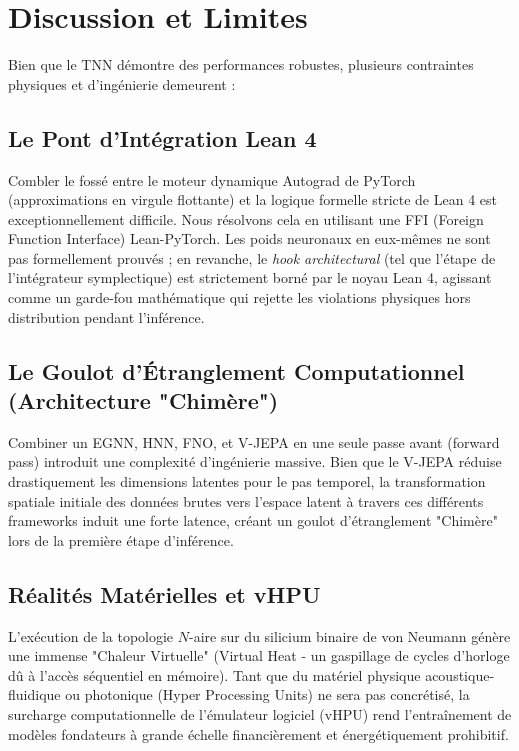 \documentclass[11pt,a4paper]{article}
\begin{document}
\section{Discussion et Limites}
Bien que le TNN démontre des performances robustes, plusieurs contraintes physiques et d'ingénierie demeurent :

\subsection{Le Pont d'Intégration Lean 4}
Combler le fossé entre le moteur dynamique Autograd de PyTorch (approximations en virgule flottante) et la logique formelle stricte de Lean 4 est exceptionnellement difficile. Nous résolvons cela en utilisant une FFI (Foreign Function Interface) Lean-PyTorch. Les poids neuronaux en eux-mêmes ne sont pas formellement prouvés ; en revanche, le \textit{hook architectural} (tel que l'étape de l'intégrateur symplectique) est strictement borné par le noyau Lean 4, agissant comme un garde-fou mathématique qui rejette les violations physiques hors distribution pendant l'inférence.

\subsection{Le Goulot d'Étranglement Computationnel (Architecture "Chimère")}
Combiner un EGNN, HNN, FNO, et V-JEPA en une seule passe avant (forward pass) introduit une complexité d'ingénierie massive. Bien que le V-JEPA réduise drastiquement les dimensions latentes pour le pas temporel, la transformation spatiale initiale des données brutes vers l'espace latent à travers ces différents frameworks induit une forte latence, créant un goulot d'étranglement "Chimère" lors de la première étape d'inférence.

\subsection{Réalités Matérielles et vHPU}
L'exécution de la topologie $N$-aire sur du silicium binaire de von Neumann génère une immense "Chaleur Virtuelle" (Virtual Heat - un gaspillage de cycles d'horloge dû à l'accès séquentiel en mémoire). Tant que du matériel physique acoustique-fluidique ou photonique (Hyper Processing Units) ne sera pas concrétisé, la surcharge computationnelle de l'émulateur logiciel (vHPU) rend l'entraînement de modèles fondateurs à grande échelle financièrement et énergétiquement prohibitif.
\end{document}
